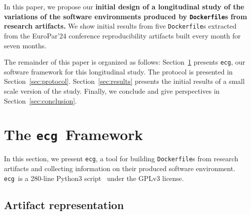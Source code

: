 \documentclass[sigconf,natbib=false]{acmart}
\newcommand{\df}{\texttt{Dockerfile}}
\newcommand{\ecg}{\texttt{ecg}}
\newcommand{\todo}[1]{{\color{red}{TODO: #1}}}
\begin{document}
In this paper, we propose our \textbf{initial design of a longitudinal study of the variations of the software environments produced by \df s from research artifacts.}
We show initial results from five \df s extracted from the EuroPar'24 conference reproducibility artifacts built every month for seven months.

% 

The remainder of this paper is organized as follows:
Section~\ref{sec:ecg} presents \ecg, our software framework for this longitudinal study.
The protocol is presented in Section~\ref{sec:protocol}.
Section~\ref{sec:results} presents the initial results of a small scale version of the study.
Finally, we conclude and give perspectives in Section~\ref{sec:conclusion}.

\section{The \ecg\ Framework}\label{sec:ecg}


In this section, we present \ecg, a tool for building \df s from research artifacts and collecting information on their produced software environment.
\ecg\ is a 280-line Python3 script~\cite{ecg} under the GPLv3 license.

\subsection{Artifact representation}\label{sec:nickel}
\end{document}
